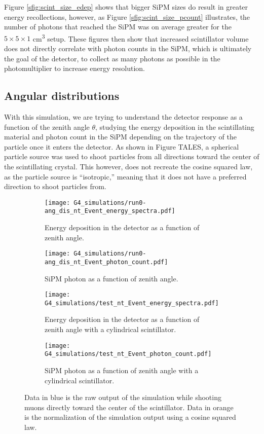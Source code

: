 Figure \ref{sfig:scint_size_edep} shows that bigger SiPM sizes do result in greater energy recollections, however, as Figure \ref{sfig:scint_size_pcount} illustrates, the number of photons that reached the SiPM was on average greater for the $5\times5\times1$ \unit{\cm\cubed} setup. These figures then show that increased scintillator volume does not directly correlate with photon counts in the SiPM, which is ultimately the goal of the detector, to collect as many photons as possible in the photomultiplier to increase energy resolution.

\subsection{Angular distributions}\label{sec:cos_squared}

With this simulation, we are trying to understand the detector response as a function of the zenith angle $\theta$, studying the energy deposition in the scintillating material and photon count in the SiPM depending on the trajectory of the particle once it enters the detector. As shown in Figure TALES, a spherical particle source was used to shoot particles from all directions toward the center of the scintillating crystal. This however, does not recreate the cosine squared law, as the particle source is ``isotropic,'' meaning that it does not have a preferred direction to shoot particles from.

\begin{figure}[H]
  \centering
  \begin{subfigure}[t]{0.48\textwidth}
    \texttt{[image: G4\_simulations/run0-ang\_dis\_nt\_Event\_energy\_spectra.pdf]}
    \caption{\label{sfig:ang_edep}Energy deposition in the detector as a function of zenith angle.}
  \end{subfigure}
  \hfill
  \begin{subfigure}[t]{0.48\textwidth}
    \texttt{[image: G4\_simulations/run0-ang\_dis\_nt\_Event\_photon\_count.pdf]}
    \caption{\label{sfig:ang_pcount}SiPM photon as a function of zenith angle.}
  \end{subfigure}
  \medskip
  \begin{subfigure}[t]{0.48\textwidth}
    \texttt{[image: G4\_simulations/test\_nt\_Event\_energy\_spectra.pdf]}
    \caption{\label{sfig:ang_edep_cylinder}Energy deposition in the detector as a function of zenith angle with a cylindrical scintillator.}
  \end{subfigure}
  \hfill
  \begin{subfigure}[t]{0.48\textwidth}
    \texttt{[image: G4\_simulations/test\_nt\_Event\_photon\_count.pdf]}
    \caption{\label{sfig:ang_pcount_cylinder}SiPM photon as a function of zenith angle with a cylindrical scintillator.}
  \end{subfigure}
  \caption{\label{fig:ang_results}Data in blue is the raw output of the simulation while shooting muons directly toward the center of the scintillator. Data in orange is the normalization of the simulation output using a cosine squared law.}
\end{figure}

